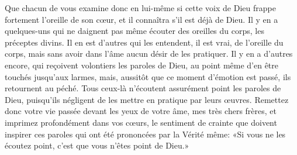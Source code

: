 Que chacun de vous examine donc en lui-même
	si cette voix de Dieu frappe fortement l’oreille de son cœur,
	et il connaîtra s’il est déjà de Dieu.
Il y en a quelques-uns qui ne daignent pas même écouter des oreilles du corps,
	les préceptes divins.
Il en est d’autres qui les entendent, il est vrai, de l’oreille du corps,
	mais sans avoir dans l’âme aucun désir de les pratiquer.
Il y en a d’autres encore, qui reçoivent volontiers les paroles de Dieu,
	au point même d’en être touchés jusqu’aux larmes,
	mais, aussitôt que ce moment d’émotion est passé, ils retournent au péché.
Tous ceux-là n’écoutent assurément point les paroles de Dieu,
	puisqu’ils négligent de les mettre en pratique par leurs œuvres.
Remettez donc votre vie passée devant les yeux de votre âme,
		mes très chers frères,
	et imprimez profondément dans vos cœurs,
	le sentiment de crainte que doivent inspirer ces paroles
	qui ont été prononcées par la Vérité même:
	«Si vous ne les écoutez point, c’est que vous n’êtes point de Dieu.»
